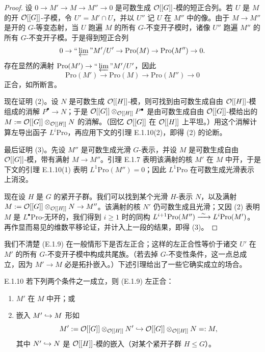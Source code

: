 \begin{proof}
设 $0\to M'\to M\to M''\to0$ 是可数生成 $\mathcal{O}[[G]]$-模的短正合列。若 $U$ 是 $M$ 的开 $\mathcal{O}[[G]]$-子模，令 $U'=M'\cap U$，并以 $U''$ 记 $U$ 在 $M''$ 中的像。由于 $M\to M''$ 是开的 $G$-等变态射，当 $U$ 跑遍 $M$ 的所有 $G$-不变开子模时，诸像 $U''$ 跑遍 $M''$ 的所有 $G$-不变开子模。于是得到短正合列
\[
0\to\text{``}\varprojlim\text{''}M'/U'\to\mathrm{Pro}(M)\to\mathrm{Pro}(M'')\to0.
\]
存在显然的满射 $\mathrm{Pro}(M')\to\text{``}\varprojlim\text{''}M'/U'$，因此
\begin{equation}\tag{E.1.9}\label{eq:a4-20-1}
\mathrm{Pro}(M')\to\mathrm{Pro}(M)\to\mathrm{Pro}(M'')\to0
\end{equation}
正合，如所断言。

现在证明 (2)。设 $N$ 是可数生成 $\mathcal{O}[[H]]$-模，则可找到由可数生成自由 $\mathcal{O}[[H]]$-模组成的消解 $P^\bullet\to N$；于是 $\mathcal{O}[[G]]\otimes_{\mathcal{O}[[H]]}P^\bullet$ 是由可数生成自由 $\mathcal{O}[[G]]$-模给出的 $M:=\mathcal{O}[[G]]\otimes_{\mathcal{O}[[H]]}N$ 的消解。（回忆 $\mathcal{O}[[G]]$ 在 $\mathcal{O}[[H]]$ 上平坦。）用这个消解计算左导出函子 $L^i\mathrm{Pro}$，再应用下文的引理 E.1.10(2)，即得 (2) 的论断。

最后证明 (3)。先设 $M''$ 是可数生成光滑 $G$-表示，并设 $M$ 是可数生成自由 $\mathcal{O}[[G]]$-模，带有满射 $M\to M''$。引理 E.1.7 表明该满射的核 $M'$ 在 $M$ 中开，于是下文的引理 E.1.10(1) 表明 $L^1\mathrm{Pro}(M'')=0$；因此 $L^1\mathrm{Pro}$ 在可数生成光滑表示上消没。

现在设 $H$ 是 $G$ 的紧开子群。我们可以找到某个光滑 $H$-表示 $N$，以及满射 $M:=\mathcal{O}[[G]]\otimes_{\mathcal{O}[[H]]}N\to M''$。该满射的核 $N'$ 仍可数生成且光滑；又因 (2) 表明 $M$ 是 $L^\bullet\mathrm{Pro}$-无环的，我们得到 $i\ge1$ 时的同构 $L^{i+1}\mathrm{Pro}(M'')\xrightarrow{\ \sim\ } L^i\mathrm{Pro}(M')$。再作显而易见的维数平移论证，并计入上一段的结果，即得 (3)。
\end{proof}

我们不清楚 (E.1.9) 在一般情形下是否左正合；这样的左正合性等价于诸交 $U'$ 在 $M'$ 的所有 $G$-不变开子模中构成共尾族。（若去掉 $G$-不变性条件，这一点总成立，因为 $M'\to M$ 必是拓扑嵌入。）下述引理给出了一些它确实成立的场合。


\begin{lem}{E.1.10}\label{thm:a4-20-11}
若下列两个条件之一成立，则 (E.1.9) 左正合：
\begin{enumerate}[label=(\arabic*)]
\item $M'$ 在 $M$ 中开；或
\item 嵌入 $M'\hookrightarrow M$ 形如
\[
M':=\mathcal{O}[[G]]\otimes_{\mathcal{O}[[H]]}N'\hookrightarrow\mathcal{O}[[G]]\otimes_{\mathcal{O}[[H]]}N=:M,
\]
其中 $N'\hookrightarrow N$ 是 $\mathcal{O}[[H]]$-模的嵌入（对某个紧开子群 $H\le G$）。
\end{enumerate}
\end{lem}


